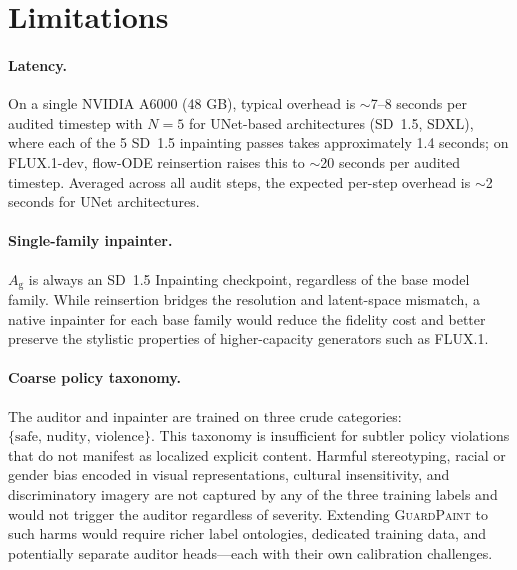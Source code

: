 \documentclass[11pt]{article}
\newcommand{\Ag}{A_{\mathrm{g}}}
\begin{document}
\section{Limitations}
\label{sec:limitations}

\paragraph{Latency.}
On a single NVIDIA A6000 (48 GB), typical overhead is
$\sim$7--8 seconds per audited timestep with $N=5$ for
UNet-based architectures (SD~1.5, SDXL), where each of the
5 SD~1.5 inpainting passes takes approximately 1.4 seconds;
on FLUX.1-dev, flow-ODE reinsertion raises this to
$\sim$20 seconds per audited timestep. Averaged across all
audit steps, the expected per-step overhead is $\sim$2 seconds for UNet
architectures.

\paragraph{Single-family inpainter.}
$\Ag$ is always an SD~1.5 Inpainting checkpoint, regardless of the base
model family. While reinsertion bridges the resolution and latent-space
mismatch, a native inpainter for each base family would reduce the fidelity
cost and better preserve the stylistic properties of higher-capacity
generators such as FLUX.1.

\paragraph{Coarse policy taxonomy.}
The auditor and inpainter are trained on three crude categories:
$\{\mathrm{safe},\,\mathrm{nudity},\,\mathrm{violence}\}$.
This taxonomy is insufficient for subtler policy violations that do not
manifest as localized explicit content. Harmful stereotyping, racial or
gender bias encoded in visual representations, cultural insensitivity,
and discriminatory imagery are not captured by any of the three training
labels and would not trigger the auditor regardless of severity.
Extending \textsc{GuardPaint} to such harms would require richer label
ontologies, dedicated training data, and potentially separate auditor
heads---each with their own calibration challenges.
\end{document}
